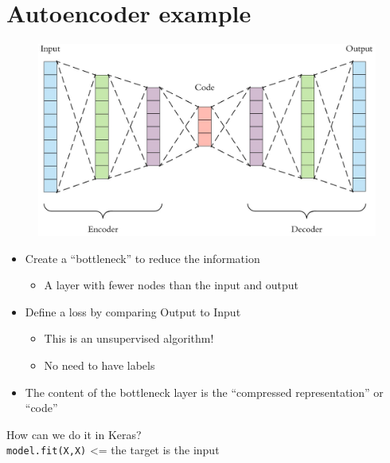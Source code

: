 \section{Autoencoder example}



\begin{figure}[ht]
	\centering
	\includegraphics[width=0.65\linewidth]{figure_ml/bottleneck.png}
\end{figure}
\FloatBarrier


\begin{itemize}
	\item Create a “bottleneck” to reduce the
	information
	\begin{itemize}
		\item A layer with fewer nodes than the input
		and output
	\end{itemize}
	\item Define a loss by comparing Output to Input
	\begin{itemize}
		\item This is an unsupervised algorithm!
		\item No need to have labels
	\end{itemize}
	\item The content of the bottleneck layer is the	“compressed representation” or “code”
\end{itemize}

How can we do it in Keras?\\
\texttt{model.fit(X,X)} <= the target is the input

